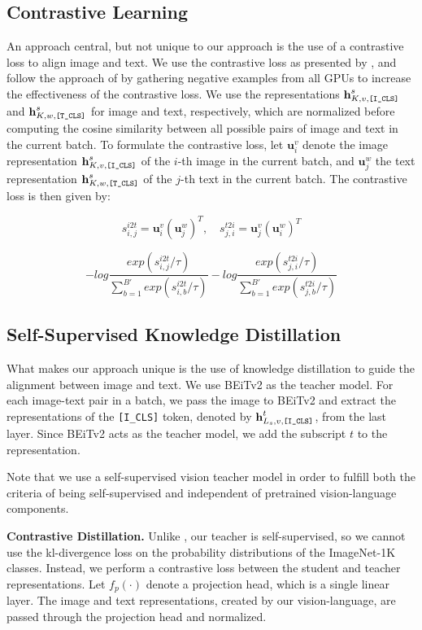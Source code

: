 \documentclass[10pt]{article} %
\begin{document}
\subsection{Contrastive Learning}
An approach central, but not unique to our approach is the use of a contrastive loss to align image and text. We use the contrastive loss
as presented by \citet{clip}, and follow the approach of \citet{vlmo} by gathering negative examples from all GPUs to increase the
effectiveness of the contrastive loss. We use the representations $\textbf{h}^{s}_{K, v, \text{\texttt{[I\_CLS]}}}$ and
$\textbf{h}^{s}_{K, w, \text{\texttt{[T\_CLS]}}}$ for image and text, respectively, which are normalized before computing the cosine similarity
between all possible pairs of image and text in the current batch. To formulate the contrastive loss, let $\textbf{u}^{v}_{i}$ denote the
image representation $\textbf{h}^{s}_{K, v, \text{\texttt{[I\_CLS]}}}$ of the $i$-th image in the current batch, and $\textbf{u}^{w}_{j}$ the
text representation $\textbf{h}^{s}_{K, w, \text{\texttt{[T\_CLS]}}}$ of the $j$-th text in the current batch. The contrastive loss is then given by:

\[
s^{i2t}_{i,j} = \textbf{u}^{v}_{i} (\textbf{u}^{w}_{j})^T, \quad s^{t2i}_{j,i} = \textbf{u}^{v}_{j} (\textbf{u}^{w}_{i})^T
\]

\[
- log \frac{exp(s^{i2t}_{i,j}/\tau)}{\sum_{b=1}^{B'} exp(s^{i2t}_{i,b}/\tau)}
- log \frac{exp(s^{t2i}_{j,i}/\tau)}{\sum_{b=1}^{B'} exp(s^{t2i}_{j,b}/\tau)}
\]

\subsection{Self-Supervised Knowledge Distillation}
What makes our approach unique is the use of knowledge distillation to guide the alignment between image and text. 
We use BEiTv2 \citep{beitv2} as the teacher model. For each image-text pair in a batch, we pass the image to BEiTv2
and extract the representations of the \texttt{[I\_CLS]} token, denoted by
$\textbf{h}^{t}_{L_{s}, v, \text{\texttt{[I\_CLS]}}}$, from the last layer. Since BEiTv2 acts as the teacher model, we add the subscript $t$ to the
representation.

Note that we use a self-supervised vision teacher model in order to fulfill both the criteria of
being self-supervised and independent of pretrained vision-language components.

\textbf{Contrastive Distillation.} Unlike \cite{shre}, our teacher is self-supervised, so we cannot use the kl-divergence loss on the probability
distributions of the ImageNet-1K \citep{imagenet} classes. Instead, we perform a contrastive loss between the student and teacher representations.
Let $f_{p}(\cdot)$ denote a projection head, which is a single linear layer. The image and text representations,
created by our vision-language, are passed through the projection head and normalized.
\end{document}
